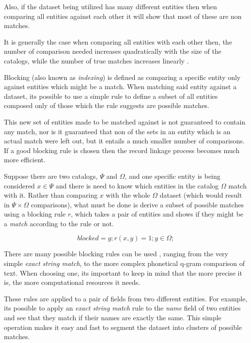 \documentclass[epsfig,a4paper,11pt,titlepage,twoside,openany]{book}
\begin{document}
Also, if the dataset being utilized has many different
entities then when comparing all entities against each other it will show that most of these are non matches.


It is generally the case when comparing all entities with each other then,
the number of comparison needed increases quadratically with the size of the
catalogs, while the number of true matches increases linearly
\cite{christen12_data}.

Blocking (also known as \textit{indexing}) is defined as comparing a specific entity only against entities which might be a match. When matching said entity against a dataset, its possible to use a simple rule to define a subset of all entities
composed only of those which the rule suggests are possible matches. 

This new set of entities made to be matched against is not guaranteed to contain any match, nor is
it guaranteed that non of the sets in an entity which is an actual match were left out, but it entails a much smaller number of comparisons. 
If a good blocking rule is chosen then the record linkage process becomes much more efficient.

Suppose there are two catalogs, $\Psi$ and $\Omega$, and one specific entity is being considered $x \in
\Psi$ and there is need to know which entities in the catalog $\Omega$ match with it.
Rather than comparing $x$ with the whole $\Omega$ dataset (which would result in
$\Psi \times \Omega$ comparisons), what must be done is derive a subset of possible matches using a
blocking rule $r$, which takes a pair of entities and shows if they might be a \textit{match} according to the rule or not.

$$
blocked = {y; r(x,y) = 1; y \in \Omega;}
$$

There are many possible blocking rules can be used
\cite{christen12_survey_index_techn_scalab_recor_linkag_dedup}, ranging from the
very simple \textit{exact string match}, to the more complex phonetical q-gram
comparison of text. When choosing one, its important to keep in mind that the more
precise it is, the more computational resources it needs.

These rules are applied to a pair of fields from two different entities. For
example, its possible to apply an \textit{exact string match} rule to the \textit{name}
field of two entities and see that they match if their names are exactly the
same. This simple operation makes it easy and fast to segment the dataset into
clusters of possible matches.
\end{document}
